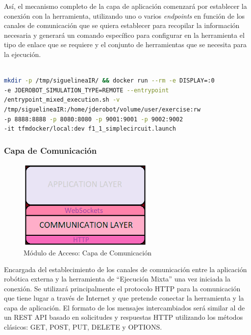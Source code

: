Así, el mecanismo completo de la capa de aplicación comenzará por establecer la conexión con la herramienta, utilizando uno o varios \textit{endpoints} en función de los canales de comunicación que se quiera establecer para recopilar la información necesaria y generará un comando específico para configurar en la herramienta el tipo de enlace que se requiere y el conjunto de herramientas que se necesita para la ejecución.

\begin{lstlisting}[language=bash, caption=Comando de configuración de Ejecución Mixta]

mkdir -p /tmp/siguelineaIR/ && docker run --rm -e DISPLAY=:0
-e JDEROBOT_SIMULATION_TYPE=REMOTE --entrypoint 
/entrypoint_mixed_execution.sh -v 
/tmp/siguelineaIR:/home/jderobot/volume/user/exercise:rw 
-p 8888:8888 -p 8080:8080 -p 9001:9001 -p 9002:9002 
-it tfmdocker/local:dev f1_1_simplecircuit.launch

\end{lstlisting}

\subsubsection{Capa de Comunicación}

\begin{figure}[!hbtp]  \centering\noindent
    \includegraphics[width=0.6\textwidth]{figures/layer3.png}
    \caption{Módulo de Acceso: Capa de Comunicación}
    \label{layer3}
\end{figure}

Encargada del establecimiento de los canales de comunicación entre la aplicación robótica externa y la herramienta de ``Ejecución Mixta'' una vez iniciada la conexión. Se utilizará principalmente el protocolo HTTP para la comunicación que tiene lugar a través de Internet y que pretende conectar la herramienta y la capa de aplicación. El formato de los mensajes intercambiados será similar al de un REST API basado en solicitudes y respuestas HTTP utilizando los métodos clásicos: GET, POST, PUT, DELETE y OPTIONS.

